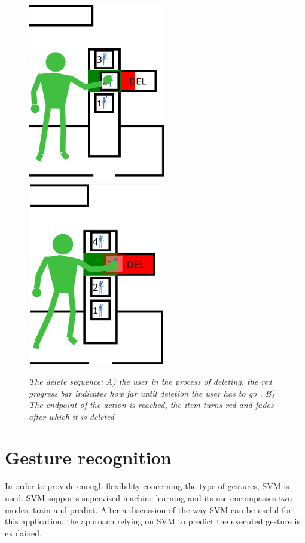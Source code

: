\begin{figure}[H]
	\begin{center}
		\includegraphics[width=6cm, height=8cm]{figures/12_delete_progress.png}
		\includegraphics[width=6cm, height=8cm]{figures/13_delete_complete.png}
		\caption{\emph{The delete sequence: A) the user in the process of deleting, the red progress bar indicates how far until deletion the user has to go , B) The endpoint of the action is reached, the item turns red and fades after which it is deleted}}
		\label{delete functionality}
	\end{center}
\end{figure}


\section{Gesture recognition}

In order to provide enough flexibility concerning the type of gestures, SVM is used. SVM supports supervised machine learning and its use encompasses two modes: train and predict. After a discussion of the way SVM can be useful for this application, the approach relying on SVM to predict the executed gesture is explained.\\


